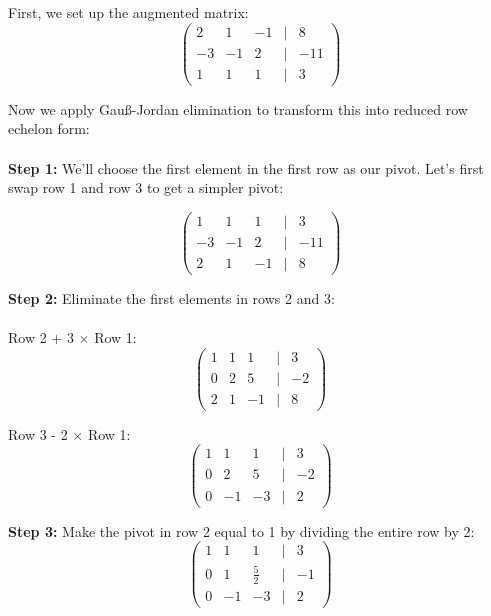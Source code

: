 First, we set up the augmented matrix:
\begin{equation*}
\begin{pmatrix}
2 & 1 & -1 & | & 8 \\
-3 & -1 & 2 & | & -11 \\
1 & 1 & 1 & | & 3
\end{pmatrix}
\end{equation*}

Now we apply Gauß-Jordan elimination to transform this into reduced row echelon form:
\\\\
\textbf{Step 1:} We'll choose the first element in the first row as our pivot. Let's first swap row 1 and row 3 to get a simpler pivot:

\begin{equation*}
\begin{pmatrix}
1 & 1 & 1 & | & 3 \\
-3 & -1 & 2 & | & -11 \\
2 & 1 & -1 & | & 8
\end{pmatrix}
\end{equation*}

\textbf{Step 2:} Eliminate the first elements in rows 2 and 3:
\\\\
Row 2 + 3 \(\times\) Row 1:
\begin{equation*}
\begin{pmatrix}
1 & 1 & 1 & | & 3 \\
0 & 2 & 5 & | & -2 \\
2 & 1 & -1 & | & 8
\end{pmatrix}
\end{equation*}

Row 3 - 2 \(\times\) Row 1:
\begin{equation*}
\begin{pmatrix}
1 & 1 & 1 & | & 3 \\
0 & 2 & 5 & | & -2 \\
0 & -1 & -3 & | & 2
\end{pmatrix}
\end{equation*}

\textbf{Step 3:} Make the pivot in row 2 equal to 1 by dividing the entire row by 2:
\begin{equation*}
\begin{pmatrix}
1 & 1 & 1 & | & 3 \\
0 & 1 & \frac{5}{2} & | & -1 \\
0 & -1 & -3 & | & 2
\end{pmatrix}
\end{equation*}

